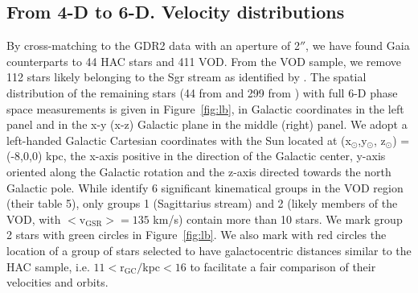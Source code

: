 \documentclass[fleqn,usenatbib]{mnras}
\begin{document}
\subsection{From 4-D to 6-D. Velocity distributions}
%
By cross-matching to the GDR2 data with an aperture of 2$''$, we have
found Gaia counterparts to 44 HAC stars and 411 VOD. From the VOD
sample, we remove 112 stars likely belonging to the Sgr stream as
identified by \citep[][, their group 1]{Vivas2016}. The spatial
distribution of the remaining stars (44 from \citealt{Simion2018} and
299 from \citealt{Vivas2016}) with full 6-D phase space measurements
is given in Figure~\ref{fig:lb}, in Galactic coordinates in the left
panel and in the x-y (x-z) Galactic plane in the middle (right)
panel. We adopt a left-handed Galactic Cartesian coordinates with the
Sun located at (x$_{\odot}$,y$_{\odot}$, z$_{\odot}$) = (-8,0,0) kpc,
the x-axis positive in the direction of the Galactic center, y-axis
oriented along the Galactic rotation and the z-axis directed towards
the north Galactic pole. While \citealt{Vivas2016} identify 6
significant kinematical groups in the VOD region (their table 5), only
groups 1 (Sagittarius stream) and 2 (likely members of the VOD, with
$\mathrm{<v_{GSR}>}= 135$ km/s) contain more than 10 stars. We mark
group 2 stars with green circles in Figure~\ref{fig:lb}. We also mark with
red circles the location of a group of stars selected to have
galactocentric distances similar to the HAC sample, i.e.
$11\mathrm{<r_{GC}}/$kpc$<16$ to facilitate a fair comparison of their
velocities and orbits.
%
\end{document}
